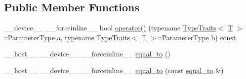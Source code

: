 \subsection*{Public Member Functions}
\begin{DoxyCompactItemize}
\item 
\-\_\-\-\_\-device\-\_\-\-\_\- \-\_\-\-\_\-forceinline\-\_\-\-\_\- bool \hyperlink{structcv_1_1gpu_1_1device_1_1equal__to_aa3c7c9a81a0c3454143ad20b97c513e2}{operator()} (typename \hyperlink{structcv_1_1gpu_1_1device_1_1TypeTraits}{Type\-Traits}$<$ \hyperlink{calib3d_8hpp_a3efb9551a871ddd0463079a808916717}{T} $>$\-::Parameter\-Type \hyperlink{legacy_8hpp_a1031d0e0a97a340abfe0a6ab9e831045}{a}, typename \hyperlink{structcv_1_1gpu_1_1device_1_1TypeTraits}{Type\-Traits}$<$ \hyperlink{calib3d_8hpp_a3efb9551a871ddd0463079a808916717}{T} $>$\-::Parameter\-Type \hyperlink{legacy_8hpp_ac04272e8ca865b8fba18d36edae9fd2a}{b}) const 
\item 
\-\_\-\-\_\-host\-\_\-\-\_\- \-\_\-\-\_\-device\-\_\-\-\_\- \-\_\-\-\_\-forceinline\-\_\-\-\_\- \hyperlink{structcv_1_1gpu_1_1device_1_1equal__to_a4372ce42828eb5c8886a08abaef6d4b7}{equal\-\_\-to} ()
\item 
\-\_\-\-\_\-host\-\_\-\-\_\- \-\_\-\-\_\-device\-\_\-\-\_\- \-\_\-\-\_\-forceinline\-\_\-\-\_\- \hyperlink{structcv_1_1gpu_1_1device_1_1equal__to_aa5cecf21afc73953f49a50c5bbb86138}{equal\-\_\-to} (const \hyperlink{structcv_1_1gpu_1_1device_1_1equal__to}{equal\-\_\-to} \&)
\end{DoxyCompactItemize}


